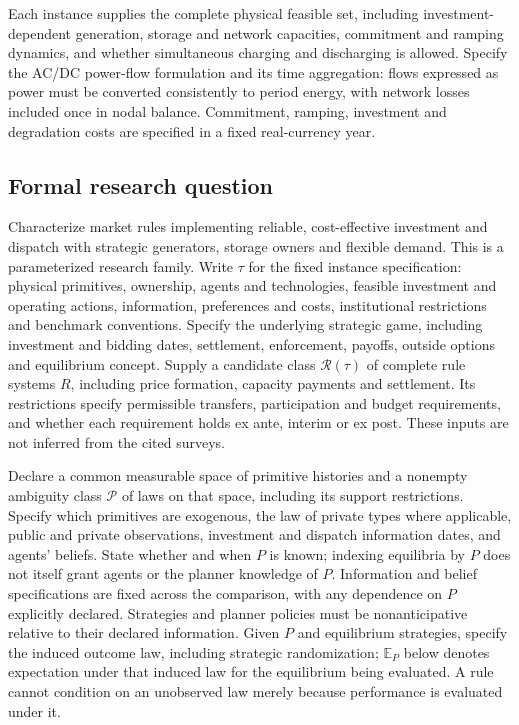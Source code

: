 \documentclass[11pt,a4paper]{article}
\begin{document}
Each instance supplies the complete physical feasible set, including investment-dependent generation, storage and network capacities, commitment and ramping dynamics, and whether simultaneous charging and discharging is allowed. Specify the AC/DC power-flow formulation and its time aggregation: flows expressed as power must be converted consistently to period energy, with network losses included once in nodal balance. Commitment, ramping, investment and degradation costs are specified in a fixed real-currency year.

\subsection*{Formal research question}

Characterize market rules implementing reliable, cost-effective investment and dispatch with strategic generators, storage owners and flexible demand. This is a parameterized research family. Write $\tau$ for the fixed instance specification: physical primitives, ownership, agents and technologies, feasible investment and operating actions, information, preferences and costs, institutional restrictions and benchmark conventions. Specify the underlying strategic game, including investment and bidding dates, settlement, enforcement, payoffs, outside options and equilibrium concept. Supply a candidate class $\mathcal R(\tau)$ of complete rule systems $R$, including price formation, capacity payments and settlement. Its restrictions specify permissible transfers, participation and budget requirements, and whether each requirement holds ex ante, interim or ex post. These inputs are not inferred from the cited surveys.

Declare a common measurable space of primitive histories and a nonempty ambiguity class $\mathcal P$ of laws on that space, including its support restrictions. Specify which primitives are exogenous, the law of private types where applicable, public and private observations, investment and dispatch information dates, and agents' beliefs. State whether and when $P$ is known; indexing equilibria by $P$ does not itself grant agents or the planner knowledge of $P$. Information and belief specifications are fixed across the comparison, with any dependence on $P$ explicitly declared. Strategies and planner policies must be nonanticipative relative to their declared information. Given $P$ and equilibrium strategies, specify the induced outcome law, including strategic randomization; $\mathbb E_P$ below denotes expectation under that induced law for the equilibrium being evaluated. A rule cannot condition on an unobserved law merely because performance is evaluated under it.
\end{document}
